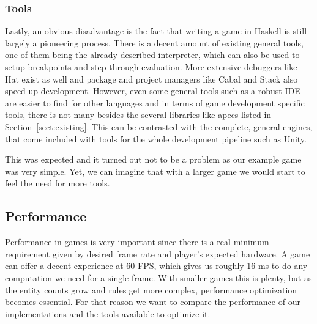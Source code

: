 \documentclass[
  digital, %
  color,   %
  table,   %
  oneside, %
  lof,     %
  lot,     %
]{fithesis3}
\begin{document}
{\subsubsection{Tools}
Lastly, an obvious disadvantage is the fact that writing a game in Haskell
is still largely a pioneering process. There is a decent amount of existing general tools,
one of them being the already described interpreter,
which can also be used to setup breakpoints and step through evaluation.
More extensive debuggers like Hat exist as well and package and project managers like Cabal
and Stack also speed up development. However, even some general tools such as a robust IDE
are easier to find for other languages and in terms of game development specific tools,
there is not many besides the several libraries like apecs listed in Section~\ref{sect:existing}.
This can be contrasted with the complete, general engines, that come included with 
tools for the whole development pipeline such as Unity.

This was expected and it turned out not to be a problem as our example game was
very simple. Yet, we can imagine that with a larger game we would start
to feel the need for more tools.



\subsection{Performance}

Performance in games is very important since there is a real minimum requirement
given by desired frame rate and player's expected hardware. A game can offer
a decent experience at 60 FPS, which gives us roughly 16 ms to do any computation
we need for a single frame. With smaller games this is plenty, but as the entity
counts grow and rules get more complex, performance optimization becomes essential.
For that reason we want to compare the performance of our implementations and
the tools available to optimize it.

}
\end{document}
